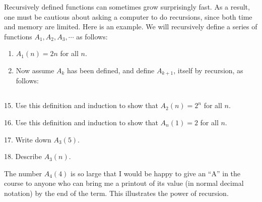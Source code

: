 \documentclass{article}
\newcommand{\0}{\mathbf 0}
\newcommand{\1}{\mathbf 1}
\begin{document}
Recursively defined functions can sometimes grow surprisingly fast. As a result, one must be cautious about asking a computer to do recursions, since both time and memory are limited. Here is an example. We will recursively define a series of functions $A_1, A_2, A_3, \cdots$ as follows:
\begin{enumerate}[\hspace{1cm}(1.)]
  \item $A_1(n) = 2n$ for all $n$.
  \item Now assume $A_k$ has been defined, and define $A_{k+1}$, itself by recursion, as follows:
\end{enumerate}

\subsection*{ }

\begin{description}
  \item{15.} Use this definition and induction to show that $A_2(n) = 2^n$ for all $n$.
  \item{16.} Use this definition and induction to show that $A_n(1) = 2$ for all $n$.
  \item{17.} Write down $A_3(5)$.
  \item{18.} Describe $A_3(n)$.
\end{description}

The number $A_4(4)$ is so large that I would be happy to give an ``A'' in the course to anyone who can bring me a printout of its value (in normal decimal notation) by the end of the term. This illustrates the power of recursion.
\end{document}
